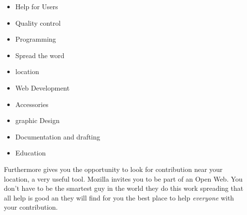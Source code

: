 \begin{itemize}
	\item Help for Users
	\item Quality control
	\item Programming
	\item Spread the word
	\item location
	\item Web Development
	\item Accessories
	\item graphic Design
	\item Documentation and drafting
	\item Education
\end{itemize}

\par Furthermore gives you the opportunity to look for contribution near your location, a very useful tool. Mozilla invites you to be part of an Open Web. You don't have to be the smartest guy in the world they do this work spreading that all help is good an they will find for you the best place to help \textit{everyone} with your contribution.

